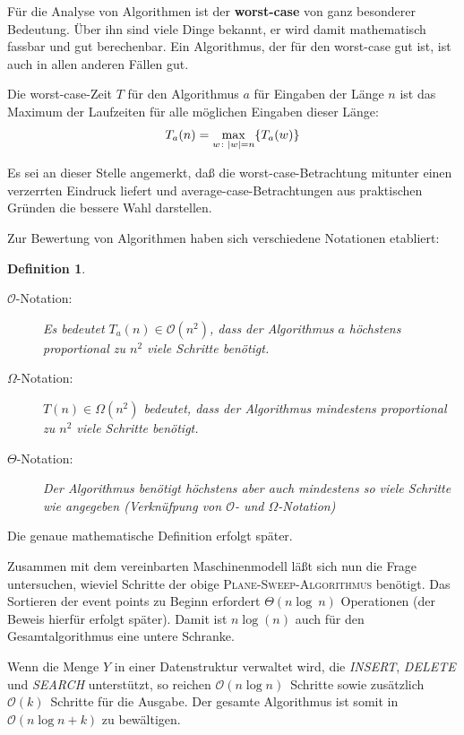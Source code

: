 \documentclass[ngerman,draft,parskip=half*,twoside]{scrreprt}
\theoremstyle{break}
\newtheorem{definition}{Definition}[chapter]
\theoremstyle{nonumberbreak}
\newcommand*{\OO}{\mathcal{O}}      %
\DeclarePairedDelimiter{\abs}{\lvert}{\rvert}
\begin{document}
Für die Analyse von Algorithmen ist der \textbf{worst-case} von ganz
besonderer Bedeutung. Über ihn sind viele Dinge bekannt, er wird
damit mathematisch fassbar und gut berechenbar. Ein Algorithmus,
der für den worst-case gut ist, ist auch in allen anderen Fällen gut.

Die worst-case-Zeit $T$ für den Algorithmus $a$ für Eingaben der Länge $n$
ist das Maximum der Laufzeiten für alle möglichen Eingaben dieser
Länge:
\begin{gather*}
  T_a(n) = \max_{w\colon \abs{w}=n}\{T_a(w)\}
\end{gather*}

Es sei an dieser Stelle angemerkt, daß die worst-case-Betrachtung mitunter
einen verzerrten Eindruck liefert und average-case-Betrachtungen aus
praktischen Gründen die bessere Wahl darstellen.

Zur Bewertung von Algorithmen haben sich verschiedene Notationen
etabliert:
\begin{definition}
  \begin{description}
   \item[$\OO$-Notation:]
    Es bedeutet $T_a(n) \in \OO(n^2)$, dass der Algorithmus $a$
    \emph{höchstens} proportional zu $n^2$ viele Schritte benötigt. 
   \item[$\Omega$-Notation:]
    $T(n) \in \Omega (n^2)$ bedeutet, dass der Algorithmus \emph{mindestens}
    proportional zu $n^2$ viele Schritte benötigt. 
   \item[$\Theta$-Notation:]
    Der Algorithmus benötigt höchstens aber auch mindestens so viele
    Schritte wie angegeben (Verknüfpung von $\OO$- und $\Omega$-Notation)
  \end{description}
\end{definition}
Die genaue mathematische Definition erfolgt später.

Zusammen mit dem vereinbarten
Maschinenmodell läßt sich nun die Frage untersuchen, wieviel Schritte
der obige \textsc{Plane-Sweep-Algorithmus} benötigt.
Das Sortieren der event points zu Beginn erfordert $\Theta(n\log~n)$
Operationen (der Beweis hierfür erfolgt später). Damit ist $n\log(n)$
auch für den Gesamtalgorithmus eine untere Schranke.

Wenn die Menge $Y$ in einer Datenstruktur verwaltet wird, die 
\textit{INSERT}, \textit{DELETE} und \textit{SEARCH} unterstützt, so
reichen $\OO(n \log n)$~Schritte sowie zusätzlich $\OO(k)$~Schritte für
die Ausgabe. Der gesamte Algorithmus ist somit in $\OO(n\log n+k)$ zu
bewältigen.
\end{document}

